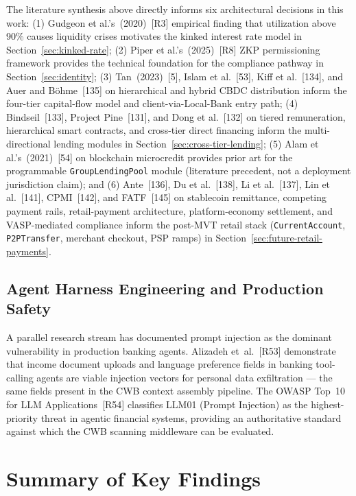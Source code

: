 \documentclass[12pt,a4paper]{report}
\begin{document}
The literature synthesis above directly informs six architectural decisions in this work: (1) Gudgeon et al.'s~(2020)~[R3] empirical finding that utilization above 90\% causes liquidity crises motivates the kinked interest rate model in Section~\ref{sec:kinked-rate}; (2) Piper et al.'s~(2025)~[R8] ZKP permissioning framework provides the technical foundation for the compliance pathway in Section~\ref{sec:identity}; (3) Tan~(2023)~[5], Islam et al.~[53], Kiff et al.~[134], and Auer and B\"{o}hme~[135] on hierarchical and hybrid CBDC distribution inform the four-tier capital-flow model and client-via-Local-Bank entry path; (4) Bindseil~[133], Project Pine~[131], and Dong et al.~[132] on tiered remuneration, hierarchical smart contracts, and cross-tier direct financing inform the multi-directional lending modules in Section~\ref{sec:cross-tier-lending}; (5) Alam et al.'s~(2021)~[54] on blockchain microcredit provides prior art for the programmable \texttt{GroupLendingPool} module (literature precedent, not a deployment jurisdiction claim); and (6) Ante~[136], Du et al.~[138], Li et al.~[137], Lin et al.~[141], CPMI~[142], and FATF~[145] on stablecoin remittance, competing payment rails, retail-payment architecture, platform-economy settlement, and VASP-mediated compliance inform the post-MVT retail stack (\texttt{CurrentAccount}, \texttt{P2PTransfer}, merchant checkout, PSP ramps) in Section~\ref{sec:future-retail-payments}.

\subsection{Agent Harness Engineering and Production Safety}
\label{sec:harness-lit}

A parallel research stream has documented prompt injection as the dominant
vulnerability in production banking agents. Alizadeh et~al.~[R53]
demonstrate that income document uploads and language preference fields in
banking tool-calling agents are viable injection vectors for personal data
exfiltration --- the same fields present in the CWB context assembly pipeline.
The OWASP Top~10 for LLM Applications~[R54] classifies LLM01 (Prompt
Injection) as the highest-priority threat in agentic financial systems, providing
an authoritative standard against which the CWB scanning middleware can be
evaluated.

\section{Summary of Key Findings}
\end{document}
